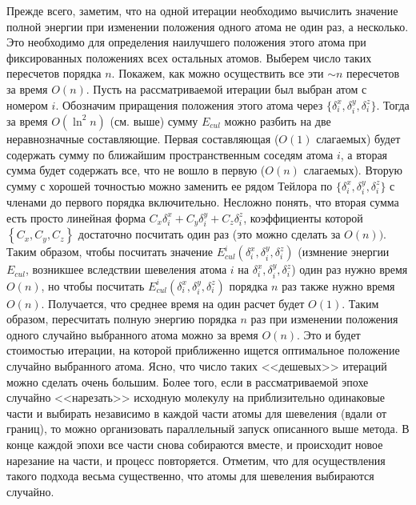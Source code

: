  Прежде всего, заметим, что на одной итерации необходимо вычислить значение полной энергии при изменении положения одного атома не один раз, а несколько. Это необходимо для определения наилучшего положения этого атома при фиксированных положениях всех остальных атомов. Выберем число таких пересчетов порядка $n$. Покажем, как можно осуществить все эти $\sim n$ пересчетов за время ${O}\left( n \right)$. Пусть на рассматриваемой итерации был выбран атом с номером $i$. Обозначим приращения положения этого   атома через $\{\delta _i^x ,\delta _i^y ,\delta _i^z \}$. Тогда за время 
  ${O}\left( {\ln ^2n} \right)$ (см. выше) сумму $E_{cul}$ можно разбить на две 
  неравнозначные составляющие. Первая составляющая (${O}\left( 1 \right)$ 
  слагаемых) будет содержать сумму по ближайшим пространственным соседям атома 
  $i$, а вторая сумма будет содержать все, что не вошло в первую (${
  O}\left( n \right)$ слагаемых). Вторую сумму с хорошей точностью можно 
  заменить ее рядом Тейлора по $\{\delta _i^x ,\delta _i^y ,\delta _i^z \}$ с 
  членами до первого порядка включительно. 
  Несложно понять, что вторая сумма есть просто линейная форма 
  $C_x \delta _i^x + C_y \delta _i^y +C_z \delta _i^z $, коэффициенты которой 
  $\left\{ {C_x ,C_y ,C_z } \right\}$ достаточно посчитать один раз (это можно 
  сделать за ${O}\left( n \right))$. Таким образом, чтобы посчитать 
  значение $E_{cul}^i \left( {\delta _i^x ,\delta _i^y ,\delta _i^z } 
  \right)$ (измнение энергии $E_{cul}$, возникшее вследствии шевеления атома $i$ на ${\delta _i^x ,\delta _i^y ,\delta _i^z }$) один раз нужно время ${O}\left( n \right)$, но чтобы посчитать 
  $E_{cul}^i \left( {\delta _i^x ,\delta _i^y ,\delta _i^z } \right)$ порядка 
  $n$ раз также нужно время ${O}\left( n \right)$. Получается, что среднее 
  время на один расчет будет ${O}\left( 1 \right)$. Таким образом, 
  пересчитать полную энергию порядка $n$ раз при изменении положения одного 
  случайно выбранного атома можно за время ${O}\left( 
  n \right)$. Это и будет стоимостью итерации, на которой приближенно ищется 
  оптимальное положение случайно выбранного атома. Ясно, что число таких 
  <<дешевых>> итераций можно сделать очень большим. Более того, если 
  в рассматриваемой эпохе случайно <<нарезать>> исходную молекулу на 
  приблизительно одинаковые части и выбирать независимо в каждой части атомы 
  для шевеления (вдали от границ), то можно организовать параллельный запуск 
  описанного выше метода. В конце каждой эпохи все части снова собираются 
  вместе, и происходит новое нарезание на части, и процесс повторяется. Отметим, что для осуществления такого подхода весьма существенно, что атомы для шевеления выбираются случайно. 


